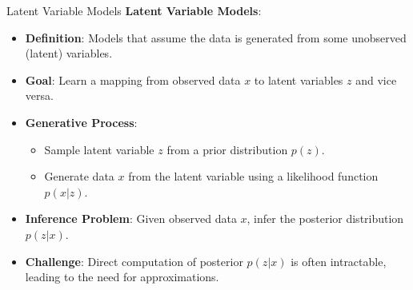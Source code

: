 \begin{frame}[allowframebreaks]{Latent Variable Models}
\textbf{Latent Variable Models}:
\begin{itemize}
    \item \textbf{Definition}: Models that assume the data is generated from some unobserved (latent) variables.
    \item \textbf{Goal}: Learn a mapping from observed data \( x \) to latent variables \( z \) and vice versa.
    \item \textbf{Generative Process}:
        \begin{itemize}
            \item Sample latent variable \( z \) from a prior distribution \( p(z) \).
            \item Generate data \( x \) from the latent variable using a likelihood function \( p(x|z) \).
        \end{itemize}
    \item \textbf{Inference Problem}: Given observed data \( x \), infer the posterior distribution \( p(z|x) \).
    \item \textbf{Challenge}: Direct computation of posterior \( p(z|x) \) is often intractable, leading to the need for approximations.
\end{itemize}
\end{frame}

